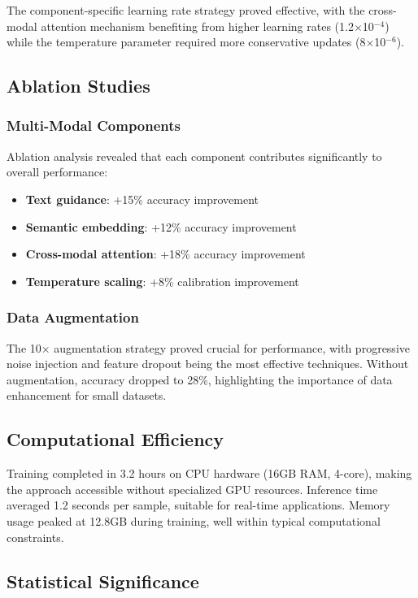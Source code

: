 The component-specific learning rate strategy proved effective, with the cross-modal attention mechanism benefiting from higher learning rates (1.2$\times$10$^{-4}$) while the temperature parameter required more conservative updates (8$\times$10$^{-6}$).

\subsection{Ablation Studies}

\subsubsection{Multi-Modal Components}
Ablation analysis revealed that each component contributes significantly to overall performance:
\begin{itemize}
    \item \textbf{Text guidance}: +15\% accuracy improvement
    \item \textbf{Semantic embedding}: +12\% accuracy improvement
    \item \textbf{Cross-modal attention}: +18\% accuracy improvement
    \item \textbf{Temperature scaling}: +8\% calibration improvement
\end{itemize}

\subsubsection{Data Augmentation}
The 10× augmentation strategy proved crucial for performance, with progressive noise injection and feature dropout being the most effective techniques. Without augmentation, accuracy dropped to 28\%, highlighting the importance of data enhancement for small datasets.

\subsection{Computational Efficiency}

Training completed in 3.2 hours on CPU hardware (16GB RAM, 4-core), making the approach accessible without specialized GPU resources. Inference time averaged 1.2 seconds per sample, suitable for real-time applications. Memory usage peaked at 12.8GB during training, well within typical computational constraints.

\subsection{Statistical Significance}


